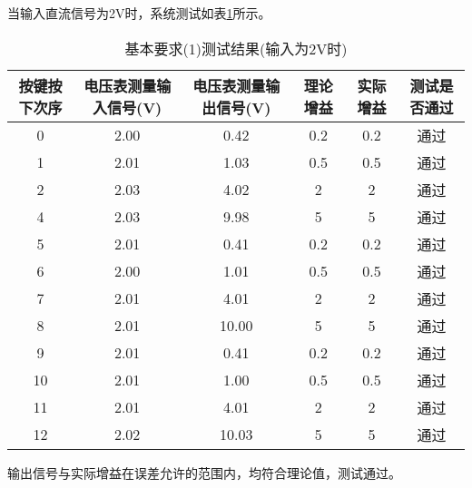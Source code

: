 \documentclass[lang=cn,11pt,a4paper]{elegantpaper}
\begin{document}
当输入直流信号为2V时，系统测试如表\ref{tab:1_2V}所示。
\begin{table}[!ht]
  \centering
  \caption{基本要求(1)测试结果(输入为2V时)}
  \begin{tabular}{cccccc}
    \textbf{按键按下次序} & \textbf{电压表测量输入信号(V)} & \textbf{电压表测量输出信号(V)} & \textbf{理论增益} & \textbf{实际增益} & \textbf{测试是否通过} \\ \hline
    0               & 2.00                  & 0.42                  & 0.2           & 0.2           & 通过              \\
    1               & 2.01                  & 1.03                  & 0.5           & 0.5           & 通过              \\
    2               & 2.03                  & 4.02                  & 2             & 2             & 通过              \\
    4               & 2.03                  & 9.98                  & 5             & 5             & 通过              \\
    5               & 2.01                  & 0.41                  & 0.2           & 0.2           & 通过              \\
    6               & 2.00                  & 1.01                  & 0.5           & 0.5           & 通过              \\
    7               & 2.01                  & 4.01                  & 2             & 2             & 通过              \\
    8               & 2.01                  & 10.00                 & 5             & 5             & 通过              \\
    9               & 2.01                  & 0.41                  & 0.2           & 0.2           & 通过              \\
    10              & 2.01                  & 1.00                  & 0.5           & 0.5           & 通过              \\
    11              & 2.01                  & 4.01                  & 2             & 2             & 通过              \\
    12              & 2.02                  & 10.03                 & 5             & 5             & 通过              \\
  \end{tabular}
  \label{tab:1_2V}
\end{table}

输出信号与实际增益在误差允许的范围内，均符合理论值，测试通过。
\end{document}
